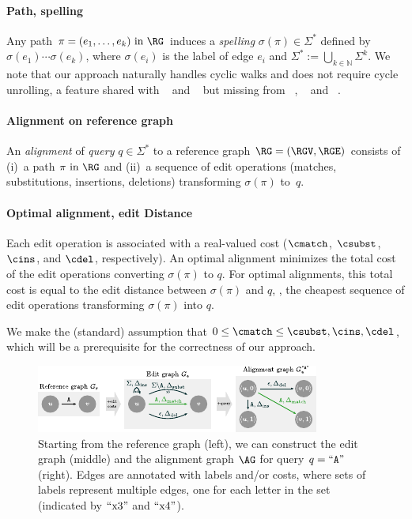 \paragraph{Path, spelling}
Any path $\pi=(e_1,\dots,e_k) \text { in } \RG$ induces a \emph{spelling}
$\sigma(\pi) \in \Sigma^*$ defined by $\sigma(e_1)\cdots\sigma(e_k)$, where
$\sigma(e_i)$ is the label of edge $e_i$ and $\Sigma^* := \bigcup_{k \in
\mathbb{N}} \Sigma^k$. We note that our approach naturally handles cyclic walks
and does not require cycle unrolling, a feature shared with
\bitparallel~\cite{rautiainen_bitparallel_2019} and
\brownie~\cite{heydari_browniealigner_2018} but missing from
\vg~\cite{garrison_variation_2018}, \pasgal~\cite{jain_accelerating_2019} and
\valigntool~\cite{kavya_sequence_2019}.

\paragraph{Alignment on reference graph}
An \emph{alignment} of \emph{query} $q \in \Sigma^*$ to a reference graph
$\RG=(\RGV,\RGE)$ consists of (i)~a path $\pi \text{ in } \RG$ and (ii)~a
sequence of edit operations (matches, substitutions, insertions, deletions)
transforming $\sigma(\pi)$ to~$q$.

\paragraph{Optimal alignment, edit Distance}
Each edit operation is associated with a real-valued cost ($\cmatch$, $\csubst$,
$\cins$, and $\cdel$, respectively).
An optimal alignment minimizes the total cost of the edit operations converting
$\sigma(\pi)$ to $q$. For optimal alignments, this total cost is equal to the
edit distance between $\sigma(\pi)$ and $q$, \ie, the cheapest sequence of edit
operations transforming $\sigma(\pi)$ into $q$.

We make the (standard) assumption that $0 \leq \cmatch \leq \csubst, \cins,
\cdel$, which will be a prerequisite for the correctness of our approach.

\begin{figure}[t]
	\centering
	\includegraphics[width=0.8\columnwidth]{edit_graph}
	\caption[Constructing the alignment graph]{Starting from the reference graph
	(left), we can construct the edit graph (middle) and the alignment graph
	$\AG$ for query $q=``\texttt{A}"$ (right). Edges are annotated with labels
	and/or costs, where sets of labels represent multiple edges, one for each
	letter in the set (indicated by $``\text{x}3"$ and $``\text{x}4"$).}
	\label{TRIEfig:graph-constructions}
\end{figure}

